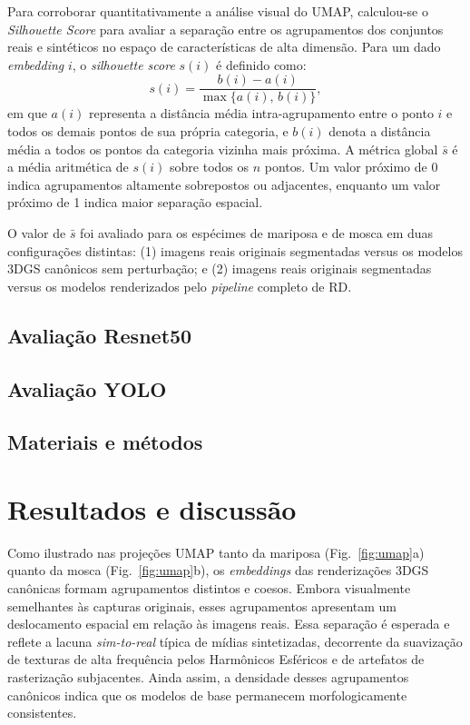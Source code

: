 \documentclass[a4paper,12pt]{article}
\begin{document}
{Para corroborar quantitativamente a análise visual do UMAP, calculou-se o \emph{Silhouette Score} \cite{rousseeuw1987silhouettes} para avaliar a separação entre os agrupamentos dos conjuntos reais e sintéticos no espaço de características de alta dimensão. Para um dado \emph{embedding} $i$, o \emph{silhouette score} $s(i)$ é definido como:
\begin{equation}
  s(i) = \frac{b(i) - a(i)}{\max\{a(i),\, b(i)\}},
\end{equation}
em que $a(i)$ representa a distância média intra-agrupamento entre o ponto $i$ e todos os demais pontos de sua própria categoria, e $b(i)$ denota a distância média a todos os pontos da categoria vizinha mais próxima. A métrica global $\bar{s}$ é a média aritmética de $s(i)$ sobre todos os $n$ pontos. Um valor próximo de 0 indica agrupamentos altamente sobrepostos ou adjacentes, enquanto um valor próximo de 1 indica maior separação espacial.

O valor de $\bar{s}$ foi avaliado para os espécimes de mariposa e de mosca em duas configurações distintas: (1) imagens reais originais segmentadas versus os modelos 3DGS canônicos sem perturbação; e (2) imagens reais originais segmentadas versus os modelos renderizados pelo \emph{pipeline} completo de RD.

\subsection{Avaliação Resnet50}

\subsection{Avaliação YOLO}


\subsection{Materiais e métodos}







 \section{Resultados e discussão}

Como ilustrado nas projeções UMAP tanto da mariposa (Fig.~\ref{fig:umap}a) quanto da mosca (Fig.~\ref{fig:umap}b), os \emph{embeddings} das renderizações 3DGS canônicas formam agrupamentos distintos e coesos. Embora visualmente semelhantes às capturas originais, esses agrupamentos apresentam um deslocamento espacial em relação às imagens reais. Essa separação é esperada e reflete a lacuna \emph{sim-to-real} típica de mídias sintetizadas, decorrente da suavização de texturas de alta frequência pelos Harmônicos Esféricos e de artefatos de rasterização subjacentes. Ainda assim, a densidade desses agrupamentos canônicos indica que os modelos de base permanecem morfologicamente consistentes.

}
\end{document}
